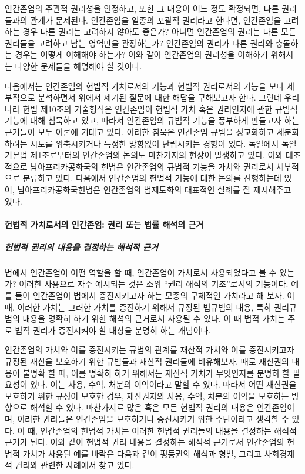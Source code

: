 인간존엄의 주관적 권리성을 인정하고, 또한 그 내용이 어느 정도 확정되면, 다른 권리들과의 관계가 문제된다. 인간존엄을 일종의 포괄적 권리라고 한다면, 인간존엄을 고려하는 경우 다른 권리는 고려하지 않아도 좋은가? 아니면 인간존엄의 권리는 다른 모든 권리들을 고려하고 남는 영역만을 관장하는가? 인간존엄의 권리가 다른 권리와 충돌하는 경우는 어떻게 이해해야 하는가? 이와 같이 인간존엄의 권리성을 이해하기 위해서는 다양한 문제들을 해명해야 할 것이다.

다음에서는 인간존엄의 헌법적 가치로서의 기능과 헌법적 권리로서의 기능을 보다 세부적으로 분석하면서 위에서 제기된 질문에 대한 해답을 구해보고자 한다. 그런데 우리나라 헌법 제10조의 기술형식은 인간존엄이 헌법적 가치 혹은 권리인지에 관한 규범적 기능에 대해 침묵하고 있고, 따라서 인간존엄의 규범적 기능을 풍부하게 만들고자 하는 근거들이 모두 이론에 기대고 있다. 이러한 침묵은 인간존엄 규범을 정교화하고 세분화하려는 시도를 위축시키거나 특정한 방향없이 난립시키는 경향이 있다. 독일에서 독일기본법 제1조로부터의 인간존엄의 논의도 마찬가지의 현상이 발생하고 있다. 이와 대조적으로 남아프리카공화국의 헌법은 인간존엄의 규범적 기능을 가치와 권리로서 세부적으로 분류하고 있다. 다음에서 인간존엄의 헌법적 기능에 대한 논의를 진행하는데 있어, 남아프리카공화국헌법은 인간존엄의 법제도화의 대표적인 실례를 잘 제시해주고 있다.

\paragraph{헌법적 가치로서의 인간존엄: 권리 또는 법률 해석의 근거}

\subparagraph{헌법적 권리의 내용을 결정하는 해석적 근거}

법에서 인간존엄이 어떤 역할을 할 때, 인간존엄이 가치로서 사용되었다고 볼 수 있는가? 이러한 사용으로 자주 예시되는 것은 소위 ``권리 해석의 기초''로서의 기능이다. 예를 들어 인간존엄이 법에서 증진시키고자 하는 모종의 구체적인 가치라고 해 보자. 이 때, 이러한 가치는 그러한 가치를 증진하기 위해서 규정된 법규범의 내용, 특히 권리규범의 내용을 명확히 하기 위한 해석의 근거로서 사용될 수 있다. 이 때 법적 가치는 주로 법적 권리가 증진시켜야 할 대상을 분명히 하는 개념이다.

인간존엄의 가치와 이를 증진시키는 규범의 관계를 재산적 가치와 이를 증진시키고자 규정된 재산을 보호하기 위한 규범들과 재산적 권리들에 비유해보자. 때로 재산권의 내용이 불명확 할 때, 이를 명확히 하기 위해서는 재산적 가치가 무엇인지를 분명히 할 필요성이 있다. 이는 사용, 수익, 처분의 이익이라고 말할 수 있다. 따라서 어떤 재산권을 보호하기 위한 규정이 모호한 경우, 재산권자의 사용, 수익, 처분의 이익을 보호하는 방향으로 해석할 수 있다. 마찬가지로 많은 혹은 모든 헌법적 권리의 내용은 인간존엄이며, 이러한 권리들은 인간존엄을 보호하거나 증진시키기 위한 수단이라고 생각할 수 있다. 이 때, 인간존엄의 헌법적 가치는 이러한 헌법적 권리들의 내용을 결정하는 해석적 근거가 된다. 이와 같이 헌법적 권리 내용을 결정하는 해석적 근거로서 인간존엄의 헌법적 가치가 사용된 예를 바락은 다음과 같이 평등권의 해석과 형벌, 그리고 사회경제적 권리와 관련한 사례에서 찾고 있다.


